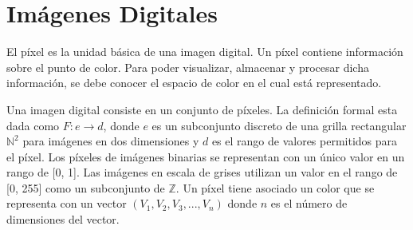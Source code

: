 \section{Imágenes Digitales}
El píxel es la unidad básica de una imagen digital. Un píxel contiene información sobre el punto de color. Para poder visualizar, almacenar y procesar dicha información, se debe conocer el espacio de color en el cual está representado.

Una imagen digital consiste en un conjunto de píxeles. La definición formal esta dada como $F:e\rightarrow d$, donde $e$ es un subconjunto discreto de una grilla rectangular $\mathbb{N}^{2}$ para imágenes en dos dimensiones y $d$ es el rango de valores permitidos para el píxel.
Los píxeles de imágenes binarias se representan con un único valor en un rango de [0, 1]. Las imágenes en escala de grises utilizan un valor en el rango de [0, 255] como un subconjunto de $\mathbb{Z}$. Un píxel tiene asociado un color que se representa con un vector $(V_{1},V_{2},V_{3},...,V_{n})$ donde $n$ es el número de dimensiones del vector. 